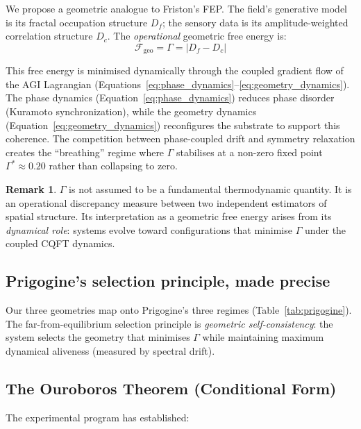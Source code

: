 \documentclass[12pt,a4paper]{article}
\theoremstyle{plain}
\theoremstyle{definition}
\newtheorem{remark}[theorem]{Remark}
\newcommand{\Fc}{\mathcal{F}}
\begin{document}
We propose a geometric analogue to Friston's FEP. The field's generative model
is its fractal occupation structure $D_f$; the sensory data is its amplitude-weighted
correlation structure $D_c$. The \emph{operational} geometric free energy is:
\begin{equation}
\Fc_{\text{geo}} = \Gamma = |D_f - D_c|
\end{equation}

This free energy is minimised dynamically through the coupled gradient flow
of the AGI Lagrangian (Equations~\ref{eq:phase_dynamics}--\ref{eq:geometry_dynamics}).
The phase dynamics (Equation~\ref{eq:phase_dynamics}) reduces phase disorder
(Kuramoto synchronization), while the geometry dynamics (Equation~\ref{eq:geometry_dynamics})
reconfigures the substrate to support this coherence. The competition between
phase-coupled drift and symmetry relaxation creates the ``breathing'' regime
where $\Gamma$ stabilises at a non-zero fixed point $\Gamma^* \approx 0.20$
rather than collapsing to zero.

\begin{remark}
$\Gamma$ is not assumed to be a fundamental thermodynamic quantity. It is an
operational discrepancy measure between two independent estimators of spatial
structure. Its interpretation as a geometric free energy arises from its \emph{dynamical
role}: systems evolve toward configurations that minimise $\Gamma$ under the
coupled CQFT dynamics.
\end{remark}

\subsection{Prigogine's selection principle, made precise}

Our three geometries map onto Prigogine's three regimes (Table~\ref{tab:prigogine}).
The far-from-equilibrium selection principle is \emph{geometric self-consistency}:
the system selects the geometry that minimises $\Gamma$ while maintaining maximum
dynamical aliveness (measured by spectral drift).

\subsection{The Ouroboros Theorem (Conditional Form)}
\label{sec:ouroboros}

The experimental program has established:
\end{document}
